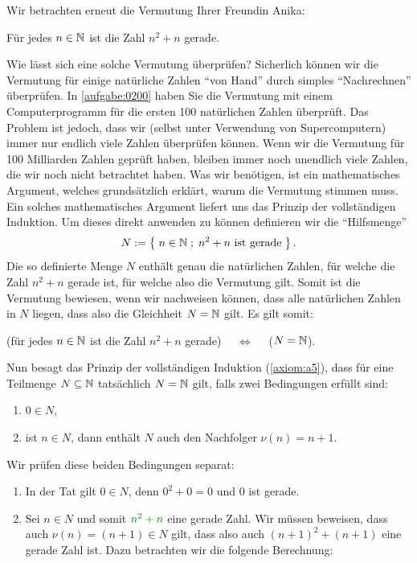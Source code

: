 {
Wir betrachten erneut die Vermutung Ihrer Freundin Anika:
\begin{center}
    Für jedes $n\in\mathbb{N}$ ist die Zahl $n^2+n$ gerade.
\end{center}
Wie lässt sich eine solche Vermutung überprüfen? Sicherlich können wir die Vermutung für einige natürliche Zahlen \enquote{von Hand} durch simples \enquote{Nachrechnen} überprüfen. In \cref{aufgabe:0200} haben Sie die Vermutung mit einem Computerprogramm für die ersten 100 natürlichen Zahlen überprüft. Das Problem ist jedoch, dass wir (selbst unter Verwendung von Supercomputern) immer nur endlich viele Zahlen überprüfen können. Wenn wir die Vermutung für 100 Milliarden Zahlen geprüft haben, bleiben immer noch unendlich viele Zahlen, die wir noch nicht betrachtet haben. Was wir benötigen, ist ein mathematisches Argument, welches grundsätzlich erklärt, warum die Vermutung stimmen muss. Ein solches mathematisches Argument liefert uns das Prinzip der vollständigen Induktion. Um dieses direkt anwenden zu können definieren wir die \enquote{Hilfsmenge}
\begin{align*}
    N:=\left\{\;n\in\mathbb{N} \; ; \; \text{$n^2+n$ ist gerade} \;\right\}.
\end{align*}
Die so definierte Menge $N$ enthält genau die natürlichen Zahlen, für welche die Zahl $n^2+n$ gerade ist, für welche also die Vermutung gilt. Somit ist die Vermutung bewiesen, wenn wir nachweisen können, dass alle natürlichen Zahlen in $N$ liegen, dass also die Gleichheit $N=\mathbb{N}$ gilt. Es gilt somit:
\begin{center}
    (für jedes $n\in\mathbb{N}$ ist die Zahl $n^2+n$ gerade) $\quad\iff\quad$ ($N = \mathbb{N}$).
\end{center}
Nun besagt das Prinzip der vollständigen Induktion (\cref{axiom:a5}), dass für eine Teilmenge $N\subseteq\mathbb{N}$ tatsächlich $N=\mathbb{N}$ gilt, falls zwei Bedingungen erfüllt sind:
\begin{enumerate}
    \item $0\in N$,
    \item ist $n\in N$, dann enthält $N$ auch den Nachfolger $\nu(n) = n+1$.
\end{enumerate}
Wir prüfen diese beiden Bedingungen separat:
\begin{enumerate}
    \item In der Tat gilt $0\in N$, denn $0^2+0 = 0$ und $0$ ist gerade. \checkmark
    \item Sei $n\in N$ und somit $\textcolor{Green}{n^2+n}$ eine gerade Zahl. Wir müssen beweisen, dass auch $\nu(n)=(n+1)\in N$ gilt, dass also auch $(n+1)^2+(n+1)$ eine gerade Zahl ist. Dazu betrachten wir die folgende Berechnung:

\end{enumerate}}
